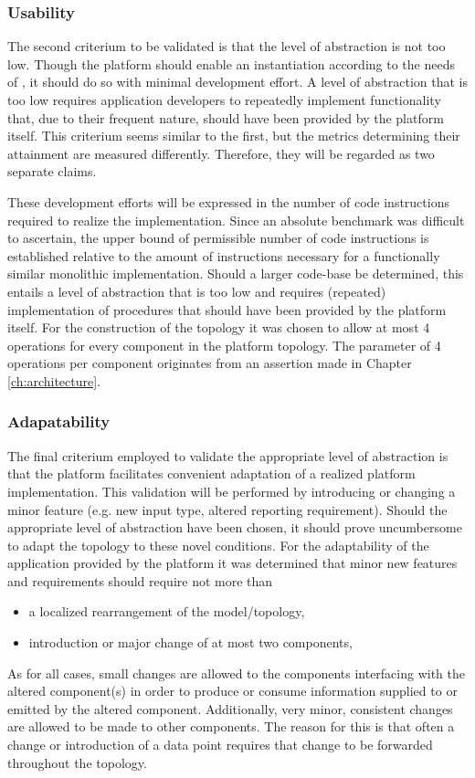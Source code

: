 \subsubsection{Usability}
The second criterium to be validated is that the level of abstraction is not too low. Though the platform should enable an instantiation according to the needs of \idsystems, it should do so with minimal development effort. A level of abstraction that is too low requires application developers to repeatedly implement functionality that, due to their frequent nature, should have been provided by the platform itself. This criterium seems similar to the first, but the metrics determining their attainment are measured differently. Therefore, they will be regarded as two separate claims.

These development efforts will be expressed in the number of code instructions required to realize the implementation. Since an absolute benchmark was difficult to ascertain, the upper bound of permissible number of code instructions is established relative to the amount of instructions necessary for a functionally similar monolithic implementation. Should a larger code-base be determined, this entails a level of abstraction that is too low and requires (repeated) implementation of procedures that should have been provided by the platform itself. For the construction of the topology it was chosen to allow at most 4 operations for every component in the platform topology. The parameter of 4 operations per component originates from an assertion made in Chapter \ref{ch:architecture}.

\subsubsection{Adapatability}
The final criterium employed to validate the appropriate level of abstraction is that the platform facilitates convenient adaptation of a realized platform implementation. This validation will be performed by introducing or changing a minor feature (e.g. new input type, altered reporting requirement). Should the appropriate level of abstraction have been chosen, it should prove uncumbersome to adapt the topology to these novel conditions. For the adaptability of the application provided by the platform it was determined that minor new features and requirements should require not more than
\begin{itemize}
\nospace
\item a localized rearrangement of the model/topology, 
\item introduction or major change of at most two components, 
\end{itemize}
As for all cases, small changes are allowed to the components interfacing with the altered component(s) in order to produce or consume information supplied to or emitted by the altered component. Additionally, very minor, consistent changes are allowed to be made to other components. The reason for this is that often a change or introduction of a data point requires that change to be forwarded throughout the topology.

